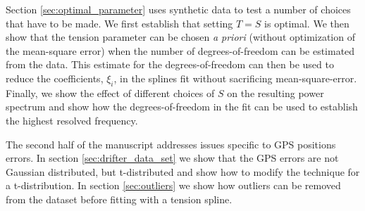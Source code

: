 \documentclass[10pt,journal]{IEEEtran}
\begin{document}
Section \ref{sec:optimal_parameter} uses synthetic data to test a number of choices that have to be made. We first establish that setting $T=S$ is optimal. We then show that the tension parameter can be chosen \emph{a priori} (without optimization of the mean-square error) when the number of degrees-of-freedom can be estimated from the data. This estimate for the degrees-of-freedom can then be used to reduce the coefficients, $\xi_i$, in the splines fit without sacrificing mean-square-error. Finally, we show the effect of different choices of $S$ on the resulting power spectrum and show how the degrees-of-freedom in the fit can be used to establish the highest resolved frequency.

The second half of the manuscript addresses issues specific to GPS positions errors. In section \ref{sec:drifter_data_set} we show that the GPS errors are not Gaussian distributed, but t-distributed and show how to modify the technique for a t-distribution. In section \ref{sec:outliers} we show how outliers can be removed from the dataset before fitting with a tension spline.





\end{document}
